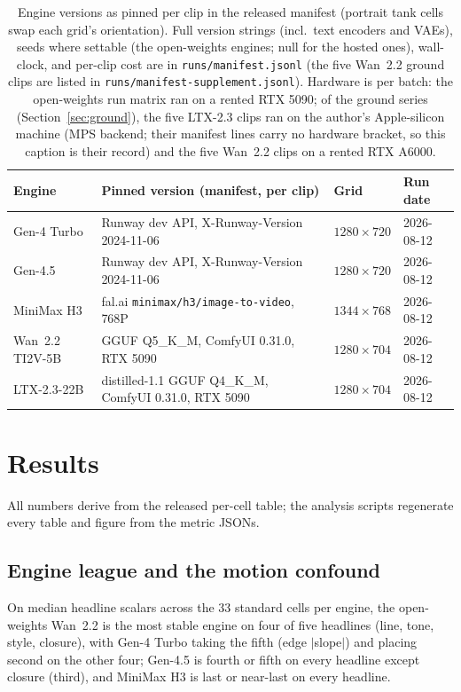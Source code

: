 \documentclass[11pt]{article}
\begin{document}
\begin{table}[h]
\centering\footnotesize\setlength{\tabcolsep}{4pt}
\begin{tabular}{@{}llll@{}}
\toprule
Engine & Pinned version (manifest, per clip) & Grid & Run date \\
\midrule
Gen-4 Turbo & Runway dev API, X-Runway-Version 2024-11-06 & $1280\times720$ & 2026-08-12 \\
Gen-4.5 & Runway dev API, X-Runway-Version 2024-11-06 & $1280\times720$ & 2026-08-12 \\
MiniMax H3 & fal.ai \texttt{minimax/h3/image-to-video}, 768P & $1344\times768$ & 2026-08-12 \\
Wan~2.2 TI2V-5B & GGUF Q5\_K\_M, ComfyUI 0.31.0, RTX 5090 & $1280\times704$ & 2026-08-12 \\
LTX-2.3-22B & distilled-1.1 GGUF Q4\_K\_M, ComfyUI 0.31.0, RTX 5090 & $1280\times704$ & 2026-08-12 \\
\bottomrule
\end{tabular}
\caption{Engine versions as pinned per clip in the released manifest
(portrait tank cells swap each grid's orientation). Full version strings
(incl.\ text encoders and VAEs), seeds where settable (the open-weights
engines; null for the hosted ones), wall-clock, and per-clip cost are in
\texttt{runs/manifest.jsonl} (the five Wan~2.2 ground clips are listed in
\texttt{runs/manifest-supplement.jsonl}). Hardware is per batch: the open-weights run
matrix ran on a rented RTX 5090; of the ground series
(Section~\ref{sec:ground}), the five LTX-2.3 clips ran on the author's
Apple-silicon machine (MPS backend; their manifest lines carry no hardware bracket,
so this caption is their record) and the five Wan~2.2 clips on a rented RTX
A6000.}
\label{tab:engines}
\end{table}

\section{Results}
\label{sec:results}

All numbers derive from the released per-cell table; the analysis scripts
regenerate every table and figure from the metric JSONs.

\subsection{Engine league and the motion confound}
\label{sec:league}

On median headline scalars across the 33 standard cells per engine, the
open-weights Wan~2.2 is the most stable engine on four of five headlines
(line, tone, style, closure), with Gen-4 Turbo taking the fifth (edge
$|$slope$|$) and placing second on the other four; Gen-4.5 is fourth or fifth
on every headline except closure (third), and MiniMax H3 is last or
near-last on every headline.
\end{document}
